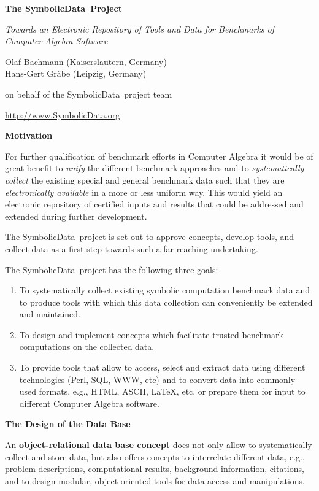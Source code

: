 \documentclass{slides}
\newcommand{\SD}{{\sc Symbolic\-Data}}
\newcommand{\titel}[1]{\begin{center}\large\bf #1\end{center}}
\begin{document}
\sloppy
\begin{center}

{\Large \bf The \SD\ Project} 

{\small\it Towards an Electronic Repository of Tools and Data for
Benchmarks of Computer Algebra Software}
\vskip3cm

Olaf Bachmann (Kaiserslautern, Germany)\\
Hans-Gert Gr\"abe (Leipzig, Germany)

on behalf of the \SD\ project team
\vskip3cm

\url{http://www.SymbolicData.org}
\end{center}
\pagebreak

\titel{Motivation}

For further qualification of benchmark efforts in Computer Algebra it
would be of great benefit to {\em unify} the different benchmark
approaches and to {\em systematically collect} the existing special
and general benchmark data such that they are {\em electronically
available} in a more or less uniform way. This would yield an
electronic repository of certified inputs and results that could be
addressed and extended during further development. 

The \SD\ project is set out to approve concepts, develop tools, and
collect data as a first step towards such a far reaching undertaking.

\pagebreak

The \SD\  project has the following three goals:
\begin{enumerate}
\item To systematically collect existing symbolic computation
  benchmark data and to produce tools with which this data collection
  can conveniently be extended and maintained.
\item To design and implement concepts which facilitate trusted
  benchmark computations on the collected data.
\item To provide tools that allow to access, select and extract data
using different technologies (Perl, SQL, WWW, etc) and to convert data
into commonly used formats, e.g., HTML, ASCII, LaTeX, etc. or prepare
them for input to different Computer Algebra software.
\end{enumerate}
\pagebreak

\titel{The Design of the Data Base}

An {\bf object-relational data base concept} does not only allow to
systematically collect and store data, but also offers concepts to
interrelate different data, e.g., problem descriptions, computational
results, background information, citations, and to design modular,
object-orien\-ted tools for data access and manipulations.
\end{document}
